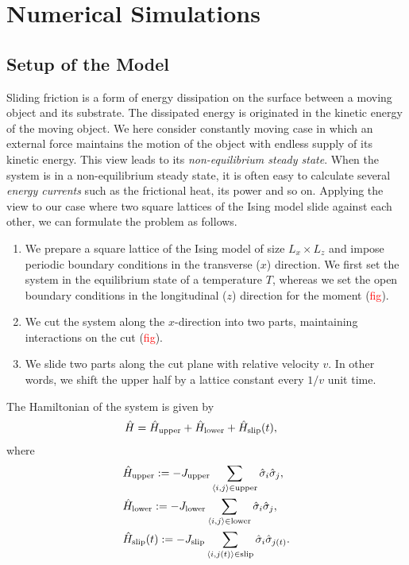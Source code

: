 \chapter{Numerical Simulations}

\section{Setup of the Model}

Sliding friction is a form of energy dissipation on the surface between a moving object and its substrate. The dissipated energy is originated in the kinetic energy of the moving object. We here consider constantly moving case in which an external force maintains the motion of the object with endless supply of its kinetic energy. This view leads to its \textit{non-equilibrium steady state}. When the system is in a non-equilibrium steady state, it is often easy to calculate several \textit{energy currents} such as the frictional heat, its power and so on. Applying the view to our case where two square lattices of the Ising model slide against each other, we can formulate the problem as follows.
\begin{enumerate}
	\item We prepare a square lattice of the Ising model of size $L_{x}\times L_{z}$ and impose periodic boundary conditions in the transverse ($x$) direction. We first set the system in the equilibrium state of a temperature $T$, whereas we set the open boundary conditions in the longitudinal ($z$) direction for the moment (\textcolor{red}{fig}).
	\item We cut the system along the $x$-direction into two parts, maintaining interactions on the cut (\textcolor{red}{fig}).
	\item We slide two parts along the cut plane with relative velocity $v$. In other words, we shift the upper half by a lattice constant every $1/v$ unit time. 
\end{enumerate}

The Hamiltonian of the system is given by
\begin{align}
&\hat{H}=\hat{H}_{\rm upper} + \hat{H}_{\rm lower} + \hat{H}_{\rm slip}(t),
\end{align}
where
\begin{align}
&\hat{H}_{\rm upper}:=-J_{\rm upper}\sum_{\langle i,j\rangle\in\mathrm{upper}}\hat{\sigma}_{i}\hat{\sigma}_{j}, \\
&\hat{H}_{\rm lower}:=-J_{\rm lower}\sum_{\langle i,j\rangle\in\mathrm{lower}}\hat{\sigma}_{i}\hat{\sigma}_{j}, \\
&\hat{H}_{\rm slip}(t):=-J_{\rm slip}\sum_{\langle i,j(t)\rangle\in\mathrm{slip}}\hat{\sigma}_{i}\hat{\sigma}_{j(t)}.
\end{align}

